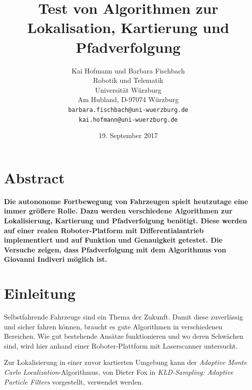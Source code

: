 \documentclass[11pt,a4paper]{article}
\begin{document}
\sloppy

\title{\Large\bf Test von Algorithmen zur Lokalisation, Kartierung und Pfadverfolgung }

\author{Kai Hofmann und Barbara Fischbach\\
  Robotik und Telematik \\
  Universit\"at W\"urzburg\\
  Am Hubland, D-97074 W\"urzburg\\
{\small \texttt{barbara.fischbach@uni-wuerzburg.de}}\\
{\small \texttt{kai.hofmann@uni-wuerzburg.de}}}

\date{19. September 2017}



\maketitle


\newpage

\twocolumn

\section*{Abstract}


	\textbf{Die autononome Fortbewegung von Fahrzeugen spielt heutzutage eine immer gr\"o\ss{}ere Rolle. Dazu werden verschiedene Algorithmen zur Lokalisierung, Kartierung und Pfadverfolgung ben\"otigt. Diese werden auf einer realen Roboter-Platform mit Differentialantrieb implementiert und auf Funktion und Genauigkeit getestet. Die Versuche zeigen, dass Pfadverfolgung mit dem Algorithmus von Giovanni Indiveri m\"oglich ist. }

\section{Einleitung}
	Selbstfahrende Fahrzeuge sind ein Thema der Zukunft. Damit diese zuverl\"assig und sicher fahren k\"onnen, braucht es gute Algorithmen in verschiedenen Bereichen. Wie gut bestehende Ans\"atze funktionieren und wo deren Schw\"achen sind, wird hier anhand einer Roboter-Plattform mit Laserscanner untersucht. 

	Zur Lokalisierung in einer zuvor kartierten Umgebung kann der \textit{Adaptive Monte Carlo Localization}-Algorithmus, von Dieter Fox in \textit{KLD-Sampling: Adaptive Particle Filters} \cite{amclPaper} vorgestellt, verwendet werden. 
	
\end{document}
